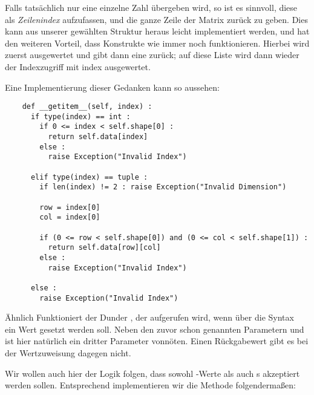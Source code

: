 Falls tatsächlich nur eine einzelne Zahl übergeben wird, so ist es sinnvoll, diese als \emph{Zeilenindex} aufzufassen, und die ganze Zeile der Matrix zurück zu geben. Dies kann aus unserer gewählten Struktur heraus leicht implementiert werden, und hat den weiteren Vorteil, dass Konstrukte wie  immer noch funktionieren. Hierbei wird zuerst  ausgewertet und gibt dann eine  zurück; auf diese Liste wird dann wieder der Indexzugriff mit index  ausgewertet.

Eine Implementierung dieser Gedanken kann so aussehen:

\begin{codebox}
\begin{verbatim}
    def __getitem__(self, index) :
      if type(index) == int :
        if 0 <= index < self.shape[0] :
          return self.data[index]
        else :
          raise Exception("Invalid Index")
        
      elif type(index) == tuple :
        if len(index) != 2 : raise Exception("Invalid Dimension")
        
        row = index[0]
        col = index[0]
        
        if (0 <= row < self.shape[0]) and (0 <= col < self.shape[1]) :
          return self.data[row][col]
        else :
          raise Exception("Invalid Index")
      
      else :
        raise Exception("Invalid Index")
\end{verbatim}
\end{codebox}

Ähnlich Funktioniert der Dunder , der aufgerufen wird, wenn über die Syntax\\
 ein Wert gesetzt werden soll. Neben den zuvor schon genannten Parametern  und  ist hier natürlich ein dritter Parameter  vonnöten. Einen Rückgabewert gibt es bei der Wertzuweisung dagegen nicht.

Wir wollen auch hier der Logik folgen, dass sowohl -Werte als auch s akzeptiert werden sollen. Entsprechend implementieren wir die Methode folgendermaßen:

